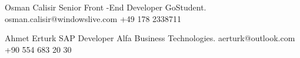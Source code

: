 
\begin{referees}
		{Osman Calisir}
		{Senior Front -End Developer }
		{GoStudent.}
		{osman.calisir@windowslive.com}
		{+49 178 2338711}
\end{referees}
\begin{referees}
		{Ahmet Erturk}
		{SAP Developer}
		{Alfa Business Technologies.}
		{aerturk@outlook.com}
		{+90 554 683 20 30}
\end{referees}

